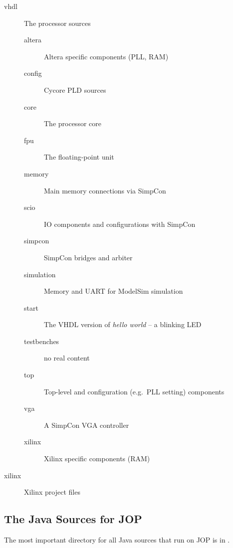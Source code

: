 \begin{description}
    \item[vhdl] The processor sources
    \begin{description}
        \item[altera] Altera specific components (PLL, RAM)
        \item[config] Cycore PLD sources
        \item[core] The processor core
        \item[fpu] The floating-point unit
        \item[memory] Main memory connections via SimpCon
        \item[scio] IO components and configurations with SimpCon
        \item[simpcon] SimpCon bridges and arbiter
        \item[simulation] Memory and UART for ModelSim simulation
        \item[start] The VHDL version of \emph{hello world} -- a blinking
        LED
        \item[testbenches] no real content
        \item[top] Top-level and configuration (e.g.\ PLL setting) components
        \item[vga] A SimpCon VGA controller
        \item[xilinx] Xilinx specific components (RAM)
    \end{description}
    \item[xilinx] Xilinx project files
\end{description}

\subsection{The Java Sources for JOP}

The most important directory for all Java sources that run on JOP is
in .

